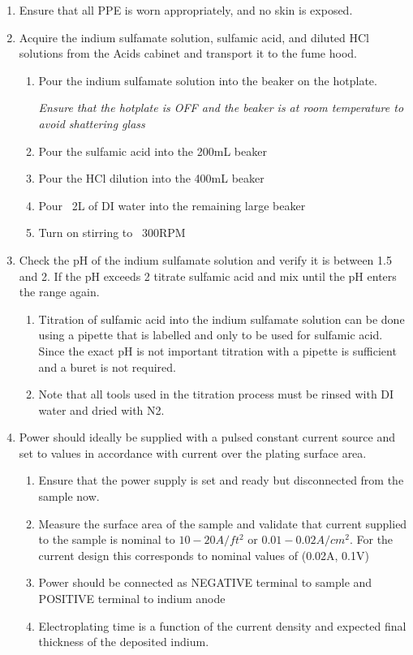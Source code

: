 \begin{tcolorbox}
\begin{enumerate}
        \item Ensure that all PPE is worn appropriately, and no skin is exposed.
        \item Acquire the indium sulfamate solution, sulfamic acid, and diluted HCl solutions from the Acids cabinet and transport it to the fume hood.
        \begin{enumerate}
            \item Pour the indium sulfamate solution into the beaker on the hotplate.


            \textit{Ensure that the hotplate is OFF and the beaker is at room temperature to avoid shattering glass}
            \item Pour the sulfamic acid into the 200mL beaker
            \item Pour the HCl dilution into the 400mL beaker
            \item Pour ~2L of DI water into the remaining large beaker
            \item Turn on stirring to ~300RPM
        \end{enumerate}

        \item Check the pH of the indium sulfamate solution and verify it is between 1.5 and 2. If the pH exceeds 2 titrate sulfamic acid and mix until the pH enters the range again.
        \begin{enumerate}
            \item Titration of sulfamic acid into the indium sulfamate solution can be done using a pipette that is labelled and only to be used for sulfamic acid. Since the exact pH is not important titration with a pipette is sufficient and a buret is not required.
            \item Note that all tools used in the titration process must be rinsed with DI water and dried with N2.
        \end{enumerate}

        \item Power should ideally be supplied with a pulsed constant current source and set to values in accordance with current over the plating surface area.
        \begin{enumerate}
            \item Ensure that the power supply is set and ready but disconnected from the sample now.
            \item Measure the surface area of the sample and validate that current supplied to the sample is nominal to $10-20A/ft^2$ or $0.01-0.02A/cm^2$. For the current design this corresponds to nominal values of (0.02A, 0.1V)
            \item Power should be connected as NEGATIVE terminal to sample and POSITIVE terminal to indium anode
            \item Electroplating time is a function of the current density and expected final thickness of the deposited indium.
        \end{enumerate}


\end{enumerate}
\end{tcolorbox}
